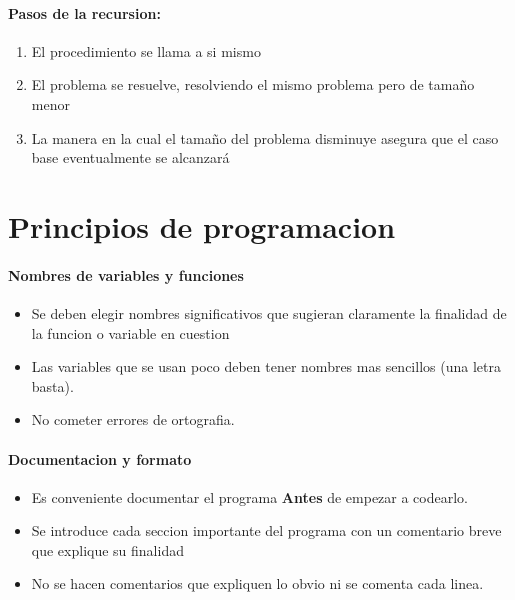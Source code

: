 \documentclass[10pt]{article}
\begin{document}
\paragraph{Pasos de la recursion:}
\begin{enumerate}
	\item El procedimiento se llama a si mismo
	\item El problema se resuelve, resolviendo el mismo problema pero de tamaño menor
	\item La manera en la cual el tamaño del problema disminuye asegura que el caso base eventualmente se alcanzará
\end{enumerate}

\section{Principios de programacion}

\paragraph{Nombres de variables y funciones}

\begin{itemize}
	\item Se deben elegir nombres significativos que sugieran claramente la finalidad de la funcion
	o variable en cuestion
	\item Las variables que se usan poco deben tener nombres mas sencillos (una letra basta).
	\item No cometer errores de ortografia.
\end{itemize}

\paragraph{Documentacion y formato}

\begin{itemize}
	\item Es conveniente documentar el programa \textbf{Antes} de empezar a codearlo.
	\item Se introduce cada seccion importante del programa con un comentario breve que explique su finalidad
	\item No se hacen comentarios que expliquen lo obvio ni se comenta cada linea.
\end{itemize}
\end{document}
